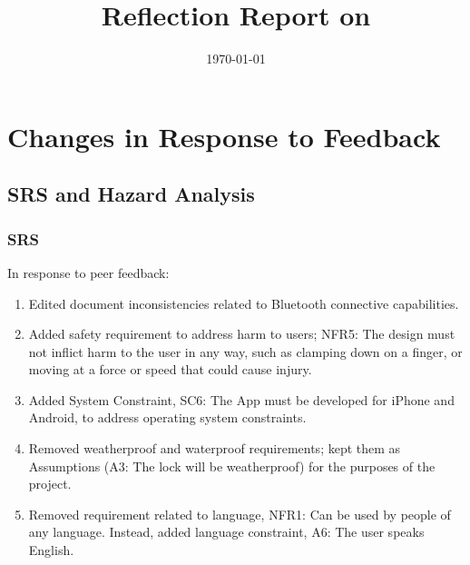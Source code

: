\documentclass{article}
\title{Reflection Report on \progname}
\author{\authname}
\date{\today}
\begin{document}
\maketitle

\newpage
\tableofcontents
\listoftables
\newpage


\section{Changes in Response to Feedback}



\subsection{SRS and Hazard Analysis}

\subsubsection{SRS}
In response to peer feedback:
\begin{enumerate}
    \item Edited document inconsistencies related to Bluetooth connective capabilities.
    \item Added safety requirement to address harm to users; NFR5: The design must not inflict harm to the user in any way, such as clamping down on a finger, or moving at a force or speed that could cause injury.
    \item Added System Constraint, SC6: The App must be developed for iPhone and Android, to address operating system constraints.
    \item Removed weatherproof and waterproof requirements; kept them as Assumptions (A3: The lock will be weatherproof) for the purposes of the project.
    \item Removed requirement related to language, NFR1: Can be used by people of any language. Instead, added language constraint, A6: The user speaks English.
\end{enumerate}
\end{document}
